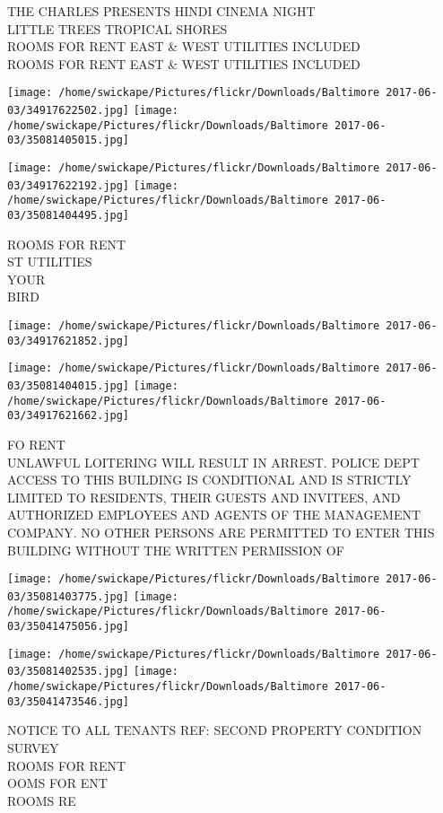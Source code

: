 \documentclass[10pt,letterpaper]{article}
\begin{document}
THE CHARLES PRESENTS HINDI CINEMA NIGHT\\
LITTLE TREES TROPICAL SHORES\\
ROOMS FOR RENT EAST \& WEST UTILITIES INCLUDED\\
ROOMS FOR RENT EAST \& WEST UTILITIES INCLUDED
\pagebreak

\texttt{[image: /home/swickape/Pictures/flickr/Downloads/Baltimore 2017-06-03/34917622502.jpg]}
\texttt{[image: /home/swickape/Pictures/flickr/Downloads/Baltimore 2017-06-03/35081405015.jpg]}

\texttt{[image: /home/swickape/Pictures/flickr/Downloads/Baltimore 2017-06-03/34917622192.jpg]}
\texttt{[image: /home/swickape/Pictures/flickr/Downloads/Baltimore 2017-06-03/35081404495.jpg]}

ROOMS FOR RENT\\
ST UTILITIES\\
YOUR\\
BIRD
\pagebreak

\texttt{[image: /home/swickape/Pictures/flickr/Downloads/Baltimore 2017-06-03/34917621852.jpg]}

\vspace{0.25in}
\texttt{[image: /home/swickape/Pictures/flickr/Downloads/Baltimore 2017-06-03/35081404015.jpg]}
\texttt{[image: /home/swickape/Pictures/flickr/Downloads/Baltimore 2017-06-03/34917621662.jpg]}

FO RENT\\
UNLAWFUL LOITERING WILL RESULT IN ARREST.  POLICE DEPT\\
ACCESS TO THIS BUILDING IS CONDITIONAL AND IS STRICTLY LIMITED TO RESIDENTS, THEIR GUESTS AND INVITEES, AND AUTHORIZED EMPLOYEES AND AGENTS OF THE MANAGEMENT COMPANY.  NO OTHER PERSONS ARE PERMITTED TO ENTER THIS BUILDING WITHOUT THE WRITTEN PERMISSION OF
\pagebreak

\texttt{[image: /home/swickape/Pictures/flickr/Downloads/Baltimore 2017-06-03/35081403775.jpg]}
\texttt{[image: /home/swickape/Pictures/flickr/Downloads/Baltimore 2017-06-03/35041475056.jpg]}

\texttt{[image: /home/swickape/Pictures/flickr/Downloads/Baltimore 2017-06-03/35081402535.jpg]}
\texttt{[image: /home/swickape/Pictures/flickr/Downloads/Baltimore 2017-06-03/35041473546.jpg]}

NOTICE TO ALL TENANTS REF: SECOND PROPERTY CONDITION SURVEY\\
ROOMS FOR RENT\\
OOMS FOR ENT\\
ROOMS RE
\pagebreak
\end{document}
